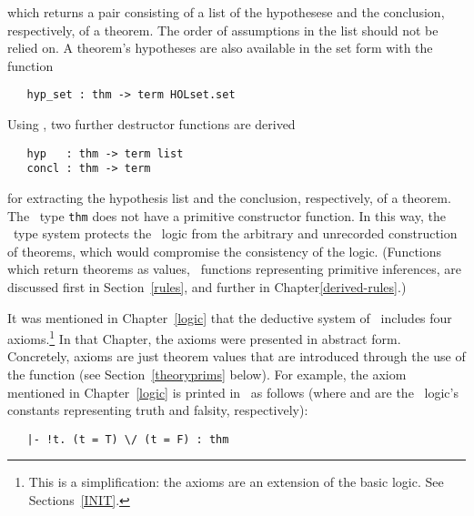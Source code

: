 \noindent which returns a pair consisting of a list of the
hypothesese and the
conclusion, respectively, of a theorem.
The order of assumptions in the list should not be relied on.  A
theorem's hypotheses are also available in the set form with the
function

\begin{boxed}
\begin{verbatim}
   hyp_set : thm -> term HOLset.set
\end{verbatim}
\end{boxed}

Using , two further destructor functions are
derived

\begin{boxed}
\begin{verbatim}
   hyp   : thm -> term list
   concl : thm -> term
\end{verbatim}
\end{boxed}

\noindent for extracting the hypothesis list and the conclusion, respectively,
of a theorem. The \ML\ type {\small\verb+thm+} does not have
a primitive constructor function.  In this way, the \ML\ type system protects
the \HOL\ logic
from the arbitrary and unrecorded construction
of theorems, which would compromise
the consistency of the logic. (Functions which return theorems as values,
\eg\ functions representing primitive inferences,
are discussed first in Section~\ref{rules}, and further in
Chapter\ref{derived-rules}.)

It was mentioned in Chapter~\ref{logic} that the deductive system of
\HOL\ includes four axioms.\footnote{This is a simplification: the
  axioms are an extension of the basic logic. See
  Sections~\ref{INIT}.}  In that Chapter, the axioms were presented in
abstract form.  Concretely, axioms are just theorem values that are
introduced through the use of the \ML{} function  (see
Section~\ref{theoryprims} below).  For example, the axiom
 mentioned in Chapter~\ref{logic} is printed in
\HOL\ as follows (where  and  are the \HOL\ logic's
constants representing truth and falsity, respectively):

\begin{hol}
\begin{verbatim}
   |- !t. (t = T) \/ (t = F) : thm
\end{verbatim}
\end{hol}

